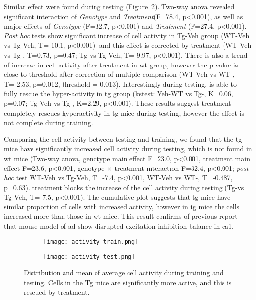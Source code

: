 Similar effect were found during testing (Figure~\ref{f.ad.acttest}). Two-way \gls{anova} revealed significant interaction of \textit{Genotype} and \textit{Treatment}(F=78.4, p<0.001), as well as major effects of \textit{Genotype} (F=32.7, p<0.001) and \textit{Treatment} (F=27.4, p<0.001). \textit{Post hoc} tests show significant increase of cell activity in Tg-Veh group (WT-Veh vs Tg-Veh, T=-10.1, p<0.001), and this effect is corrected by \tglu treatment (WT-Veh vs Tg-\glu, T=0.73, p=0.47; Tg-\glu vs Tg-Veh, T=-9.97, p<0.001). There is also a trend of increase in cell activity after \tglu treatment in \gls{wt} group, however the p-value is close to threshold after correction of multiple comparison (WT-Veh vs WT-\glu, T=-2.53, p=0.012, threshold = 0.013). Interestingly during testing, \tglu is able to fully rescue the hyper-activity in \gls{tg} group (\gls{kstest}: Veh-WT vs Tg-\glu, K=0.06, p=0.07; Tg-Veh vs Tg-\glu, K=2.29, p<0.001). These results suggest \tglu treatment completely rescues hyperactivity in \gls{tg} mice during testing, however the effect is not complete during training.  

Comparing the cell activity between testing and training, we found that the \gls{tg} mice have significantly increased cell activity during testing,  which is not found in \gls{wt} mice (Two-way \gls{anova}, genotype main effect F=23.0, p<0.001, treatment main effect F=23.6, p<0.001, genotype $\times$ treatment interaction F=32.4, p<0.001; \textit{post hoc} test WT-Veh vs Tg-Veh, T=-7.4, p<0.001, WT-Veh vs WT-\glu, T=-0.487, p=0.63). \tglu treatment blocks the increase of the cell activity during testing (Tg-\glu vs Tg-Veh, T=-7.5, p<0.001). The cumulative plot suggests that \gls{tg} mice have similar proportion of cells with increased activity, however in \gls{tg} mice the cells increased more than those in \gls{wt} mice. This result confirms of previous report that mouse model of \gls{ad} show disrupted excitation-inhibition balance in \gls{ca1}. 

\begin{figure}[h]
    \begin{subfigure}[h]{\textwidth}
        \texttt{[image: activity\_train.png]}
        \caption{\label{f.ad.acttrain}}
    \end{subfigure}
    \begin{subfigure}[h]{\textwidth}
        \texttt{[image: activity\_test.png]}
        \caption{\label{f.ad.acttest}}
    \end{subfigure}
    \caption{Distribution and mean of average cell activity during  training and  testing. Cells in the Tg mice are significantly more active, and this is rescued by \tglu treatment. \label{f.ad.activity}}
\end{figure}

